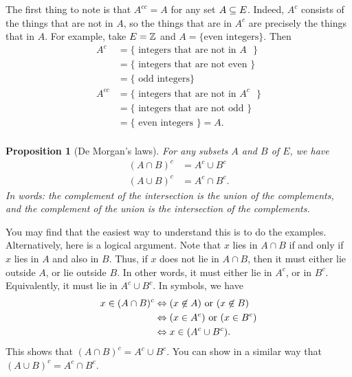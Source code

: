 \documentclass[a4paper]{book}
\newtheorem{proposition}[theorem]{Proposition}
\theoremstyle{definition}
\begin{document}
The first thing to note is that $A^{cc}=A$ for any set $A\subseteq E$.
Indeed, $A^c$ consists of the things that are not in $A$, so the
things that are  in $A^c$ are precisely the things that
 in $A$.  For example, take $E={\mathbb{Z}}$ and 
$A=\{\text{even integers}\}$.  Then
\begin{align*}
 A^c &= \{\text{ integers that are not in $A$ } \} \\
     &= \{\text{ integers that are not even } \} \\
     &= \{\text{ odd integers}\} \\
 A^{cc} &= \{\text{ integers that are not in $A^c$ } \} \\
        &= \{\text{ integers that are not odd } \} \\
        &= \{\text{ even integers }\} = A.\\
\end{align*}

\begin{proposition}[De Morgan's laws]
 For any subsets $A$ and $B$ of $E$, we have
 \begin{align*}
  (A\cap B)^c &= A^c\cup B^c \\
  (A\cup B)^c &= A^c\cap B^c.
 \end{align*}
 In words: the complement of the intersection is the union of the
 complements, and the complement of the union is the intersection of
 the complements.
\end{proposition}
You may find that the easiest way to understand this is to do the
examples.  Alternatively, here is a logical argument.  Note that $x$
lies in $A\cap B$ if and only if $x$ lies in $A$ and also in $B$.
Thus, if $x$ does not lie in $A\cap B$, then it must either lie
outside $A$, or lie outside $B$.  In other words, it must either lie
in $A^c$, or in $B^c$.  Equivalently, it must lie in $A^c\cup B^c$.
In symbols, we have
\begin{align*}
 x\in(A\cap B)^c &\Leftrightarrow (x\not\in A) \text{ or } (x\not\in B) \\
                 &\Leftrightarrow (x\in A^c) \text{ or } (x\in B^c) \\
                 &\Leftrightarrow x\in (A^c\cup B^c).
\end{align*}
This shows that $(A\cap B)^c=A^c\cup B^c$.  You can show in a similar
way that $(A\cup B)^c=A^c\cap B^c$.
\end{document}
